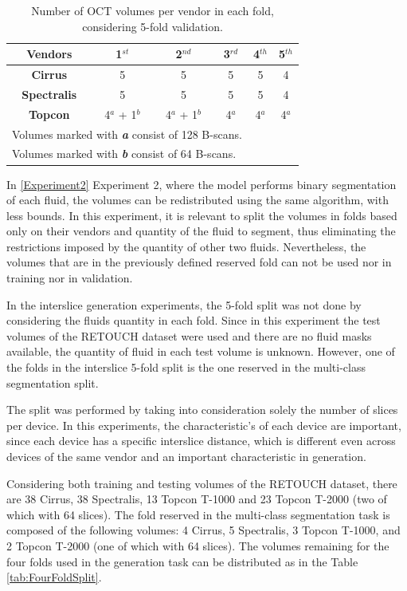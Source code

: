 \begin{table}[!ht]
	\setlength{\tabcolsep}{6pt}
	\renewcommand{\arraystretch}{1.3}
	\caption{Number of OCT volumes per vendor in each fold, considering 5-fold validation.}
	\centering
	\begin{tabular}{|c|c|c|c|c|c|}
		\hline
		\textbf{Vendors} & \textbf{1$^{st}$} & \textbf{2$^{nd}$} & \textbf{3$^{rd}$} & \textbf{4$^{th}$} & \textbf{5$^{th}$} \\
		\hline
		\textbf{Cirrus} & 5 & 5 & 5 & 5 & 4 \\
		\textbf{Spectralis} & 5 & 5 & 5 & 5 & 4 \\
		\textbf{Topcon} & 4$^{a}$ + 1$^{b}$ & 4$^{a}$ + 1$^{b}$ & 4$^{a}$ & 4$^{a}$ & 4$^{a}$ \\
		\hline
		\multicolumn{4}{l}{Volumes marked with \textbf{\textit{a}} consist of 128 B-scans.} \\
		\multicolumn{4}{l}{Volumes marked with \textbf{\textit{b}} consist of 64 B-scans.}
	\end{tabular}
	\label{tab:FiveFoldSplit}
\end{table}

In \ref{Experiment2} Experiment 2, where the model performs binary segmentation of each fluid, the volumes can be redistributed using the same algorithm, with less bounds. In this experiment, it is relevant to split the volumes in folds based only on their vendors and quantity of the fluid to segment, thus eliminating the restrictions imposed by the quantity of other two fluids. Nevertheless, the volumes that are in the previously defined reserved fold can not be used nor in training nor in validation.
\par
In the interslice generation experiments, the 5-fold split was not done by considering the fluids quantity in each fold. Since in this experiment the test volumes of the RETOUCH dataset were used and there are no fluid masks available, the quantity of fluid in each test volume is unknown. However, one of the folds in the interslice 5-fold split is the one reserved in the multi-class segmentation split.
\par
The split was performed by taking into consideration solely the number of slices per device. In this experiments, the characteristic's of each device are important, since each device has a specific interslice distance, which is different even across devices of the same vendor and an important characteristic in generation.
\par
Considering both training and testing volumes of the RETOUCH dataset, there are 38 Cirrus, 38 Spectralis, 13 Topcon T-1000 and 23 Topcon T-2000 (two of which with 64 slices). The fold reserved in the multi-class segmentation task is composed of the following volumes: 4 Cirrus, 5 Spectralis, 3 Topcon T-1000, and 2 Topcon T-2000 (one of which with 64 slices). The volumes remaining for the four folds used in the generation task can be distributed as in the Table \ref{tab:FourFoldSplit}.

